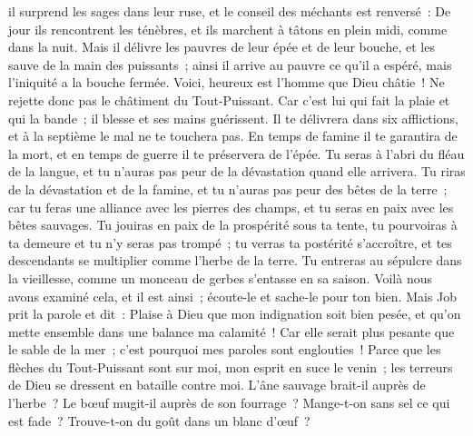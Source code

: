 \begin{multicols}{2}
il surprend les sages dans leur ruse, et le conseil des méchants est renversé~:
De jour ils rencontrent les ténèbres, et ils marchent à tâtons en plein midi, comme dans la nuit.
Mais il délivre les pauvres de leur épée et de leur bouche, et les sauve de la main des puissants~;
ainsi il arrive au pauvre ce qu'il a espéré, mais l'iniquité a la bouche fermée.
Voici, heureux est l'homme que Dieu châtie~! Ne rejette donc pas le châtiment du Tout-Puissant.
Car c'est lui qui fait la plaie et qui la bande~; il blesse et ses mains guérissent.
Il te délivrera dans six afflictions, et à la septième le mal ne te touchera pas.
En temps de famine il te garantira de la mort, et en temps de guerre il te préservera de l'épée.
Tu seras à l'abri du fléau de la langue, et tu n'auras pas peur de la dévastation quand elle arrivera.
Tu riras de la dévastation et de la famine, et tu n'auras pas peur des bêtes de la terre~;
car tu feras une alliance avec les pierres des champs, et tu seras en paix avec les bêtes sauvages.
Tu jouiras en paix de la prospérité sous ta tente, tu pourvoiras à ta demeure et tu n'y seras pas trompé~;
tu verras ta postérité s'accroître, et tes descendants se multiplier comme l'herbe de la terre.
Tu entreras au sépulcre dans la vieillesse, comme un monceau de gerbes s'entasse en sa saison.
Voilà nous avons examiné cela, et il est ainsi~; écoute-le et sache-le pour ton bien.
\VerseOne{}Mais Job prit la parole et dit~:
Plaise à Dieu que mon indignation soit bien pesée, et qu'on mette ensemble dans une balance ma calamité~!
Car elle serait plus pesante que le sable de la mer~; c'est pourquoi mes paroles sont englouties~!
Parce que les flèches du Tout-Puissant sont sur moi, mon esprit en suce le venin~; les terreurs de Dieu se dressent en bataille contre moi.
L'âne sauvage brait-il auprès de l'herbe~? Le bœuf mugit-il auprès de son fourrage~?
Mange-t-on sans sel ce qui est fade~? Trouve-t-on du goût dans un blanc d'œuf~?

\end{multicols}
